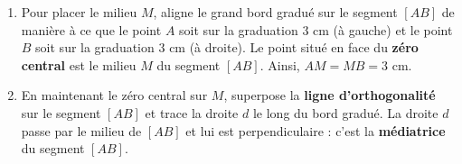 %
%
\begin{enumerate}
    \item Pour placer le milieu $M$, aligne le grand bord gradué sur le segment $[AB]$ de manière à ce que le point $A$ soit sur la graduation $3\text{ cm}$ (à gauche) et le point $B$ soit sur la graduation $3\text{ cm}$ (à droite). Le point situé en face du \textbf{zéro central} est le milieu $M$ du segment $[AB]$. Ainsi, $AM = MB = 3\text{ cm}$.
    \item En maintenant le zéro central sur $M$, superpose la \textbf{ligne d'orthogonalité} sur le segment $[AB]$ et trace la droite $d$ le long du bord gradué. La droite $d$ passe par le milieu de $[AB]$ et lui est perpendiculaire : c'est la \textbf{médiatrice} du segment $[AB]$.
\end{enumerate}
